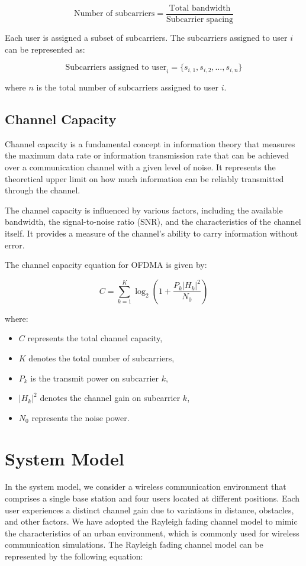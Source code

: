 \documentclass[conference]{IEEEtran}
\begin{document}
\[
\text{{Number of subcarriers}} = \frac{{\text{{Total bandwidth}}}}{{\text{{Subcarrier spacing}}}}
\]

Each user is assigned a subset of subcarriers. The subcarriers assigned to user \(i\) can be represented as:

\[
\text{{Subcarriers assigned to user}}_i = \{s_{i,1}, s_{i,2}, \ldots, s_{i,n}\}
\]

where \(n\) is the total number of subcarriers assigned to user \(i\).

\subsection{Channel Capacity}
Channel capacity is a fundamental concept in information theory that measures the maximum data rate or information transmission rate that can be achieved over a communication channel with a given level of noise. It represents the theoretical upper limit on how much information can be reliably transmitted through the channel.

The channel capacity is influenced by various factors, including the available bandwidth, the signal-to-noise ratio (SNR), and the characteristics of the channel itself. It provides a measure of the channel's ability to carry information without error.

The channel capacity equation for OFDMA is given by:

\[
C = \sum_{k=1}^{K} \log_2 \left(1 + \frac{P_k |H_k|^2}{N_0}\right)
\]

where:
\begin{itemize}
  \item $C$ represents the total channel capacity,
  \item $K$ denotes the total number of subcarriers,
  \item $P_k$ is the transmit power on subcarrier $k$,
  \item $|H_k|^2$ denotes the channel gain on subcarrier $k$,
  \item $N_0$ represents the noise power.
\end{itemize}

\section{System Model}
In the system model, we consider a wireless communication environment that comprises a single base station and four users located at different positions. Each user experiences a distinct channel gain due to variations in distance, obstacles, and other factors. We have adopted the Rayleigh fading channel model to mimic the characteristics of an urban environment, which is commonly used for wireless communication simulations.
The Rayleigh fading channel model can be represented by the following equation:
\end{document}
